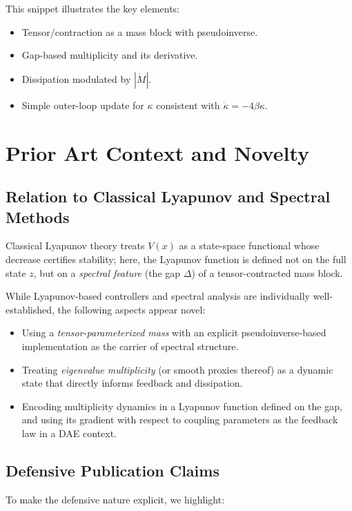 \documentclass[11pt]{article}
\begin{document}
This snippet illustrates the key elements:

\begin{itemize}
  \item Tensor/contraction as a mass block with pseudoinverse.
  \item Gap-based multiplicity and its derivative.
  \item Dissipation modulated by $|\dot M|$.
  \item Simple outer-loop update for $\kappa$ consistent with $\dot\kappa = -4\beta\kappa$.
\end{itemize}

\section{Prior Art Context and Novelty}

\subsection{Relation to Classical Lyapunov and Spectral Methods}

Classical Lyapunov theory treats $V(x)$ as a state-space functional whose decrease certifies stability; here, the Lyapunov function is defined not on the full state $z$, but on a \emph{spectral feature} (the gap $\Delta$) of a tensor-contracted mass block.

While Lyapunov-based controllers and spectral analysis are individually well-established, the following aspects appear novel:

\begin{itemize}
  \item Using a \emph{tensor-parameterized mass} with an explicit pseudoinverse-based implementation as the carrier of spectral structure.
  \item Treating \emph{eigenvalue multiplicity} (or smooth proxies thereof) as a dynamic state that directly informs feedback and dissipation.
  \item Encoding multiplicity dynamics in a Lyapunov function defined on the gap, and using its gradient with respect to coupling parameters as the feedback law in a DAE context.
\end{itemize}

\subsection{Defensive Publication Claims}

To make the defensive nature explicit, we highlight:
\end{document}
